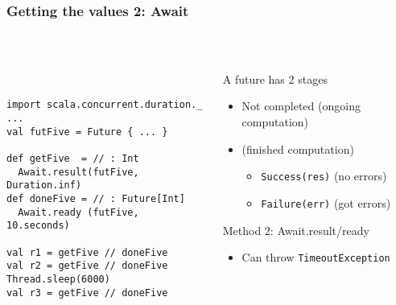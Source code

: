 \documentclass[aspectratio=169]{beamer}
\begin{document}
\begin{frame}[fragile]\frametitle{Getting the values 2: Await}
~\\[-8mm]
\begin{columns}
\begin{column}{0.56\textwidth}
~\\
\begin{lstlisting}[emph={execute,sleep,log,Future,Try,Success,Failure,onComplete,Await,result,ready}]
import scala.concurrent.duration._
...
val futFive = Future { ... }

def getFive  = // : Int
  Await.result(futFive, Duration.inf) 
def doneFive = // : Future[Int]
  Await.ready (futFive, 10.seconds)

val r1 = getFive // doneFive
val r2 = getFive // doneFive
Thread.sleep(6000)
val r3 = getFive // doneFive
\end{lstlisting}
\end{column}
\begin{column}{0.46\textwidth}
\begin{block}{A future has 2 stages}
\begin{itemize}
  \item \alert{Not completed} (ongoing computation)
  \item {} (finished computation)
  \begin{itemize}
    \item \texttt{Success(res)} (no errors)
    \item \texttt{Failure(err)} (got errors)
  \end{itemize}
\end{itemize}
\end{block}
\begin{alertblock}{Method 2: Await.result/ready}
  \begin{itemize}
    \item Can throw \texttt{TimeoutException}
  \end{itemize}
\end{alertblock}

\end{column}
\end{columns}
\end{frame}
\end{document}
